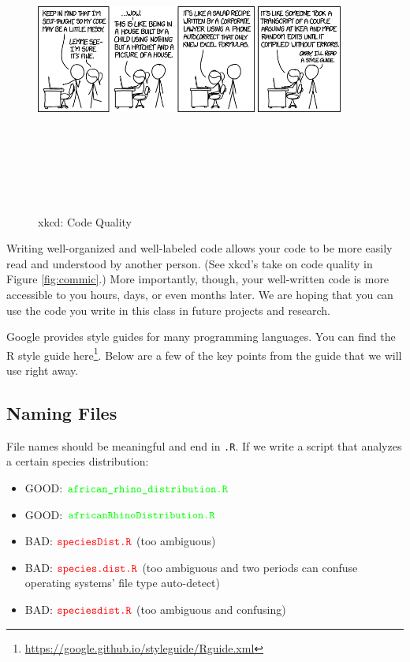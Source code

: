\documentclass[]{krantz}
\providecommand{\tightlist}{%
  \setlength{\itemsep}{0pt}\setlength{\parskip}{0pt}}
\renewcommand{\href}[2]{#2\footnote{\url{#1}}}
\begin{document}
\begin{figure}
\includegraphics[width=4in,height=4in]{02-introToR/02-images/code_quality} \caption{xkcd: Code Quality}\label{fig:comic}
\end{figure}

Writing well-organized and well-labeled code allows your code to be more easily read and understood by another person. (See xkcd's take on code quality in Figure \ref{fig:commic}.) More importantly, though, your well-written code is more accessible to you hours, days, or even months later. We are hoping that you can use the code you write in this class in future projects and research.

Google provides style guides for many programming languages. You can find the R style guide \href{https://google.github.io/styleguide/Rguide.xml}{here}. Below are a few of the key points from the guide that we will use right away.

\hypertarget{naming-files}{%
\subsection{Naming Files}\label{naming-files}}

File names should be meaningful and end in \texttt{.R}. If we write a script that analyzes a certain species distribution:

\begin{itemize}
\tightlist
\item
  GOOD: \(\color{green}{\verb+african_rhino_distribution.R+}\)
\item
  GOOD: \(\color{green}{\verb+africanRhinoDistribution.R+}\)
\item
  BAD: \(\color{red}{\verb+speciesDist.R+}\) (too ambiguous)
\item
  BAD: \(\color{red}{\verb+species.dist.R+}\) (too ambiguous and two periods can confuse operating systems' file type auto-detect)
\item
  BAD: \(\color{red}{\verb+speciesdist.R+}\) (too ambiguous and confusing)
\end{itemize}
\end{document}
